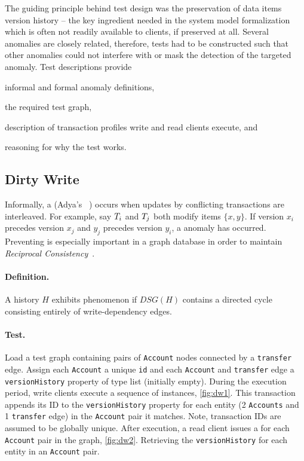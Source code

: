 The guiding principle behind test design was the preservation of data items
version history -- the key ingredient needed in the system model formalization
which is often not readily available to clients, if preserved at all. Several
anomalies are closely related, therefore, tests had to be constructed such that
other anomalies could not interfere with or mask the detection of the targeted
anomaly. Test descriptions provide
\begin{enumerate*}[label={(\roman*)}]
  \item informal and formal anomaly definitions,
  \item the required test graph,
  \item description of transaction profiles write and read clients execute, and
  \item reasoning for why the test works.
\end{enumerate*}


\subsection{Dirty Write}
\label{sec:dirty-write}

Informally, a  (Adya's ~\cite{adya1999weak})
occurs when updates by conflicting transactions are interleaved. For example,
say $T_i$ and $T_j$ both modify items $\{x,y\}$. If version $x_i$
precedes version $x_j$ and $y_j$ precedes version $y_i$, a  anomaly
has occurred. Preventing  is especially important in a graph
database in order to maintain \emph{Reciprocal Consistency}~\cite{Waudby2020}.

\paragraph{Definition.}
A history $H$ exhibits phenomenon  if $\textit{DSG}(H)$ contains a
directed cycle consisting entirely of write-dependency edges.

\paragraph{Test.}
Load a test graph containing pairs of \texttt{Account} nodes connected by a
\texttt{transfer} edge. Assign each \texttt{Account} a unique \texttt{id} and
each \texttt{Account} and \texttt{transfer} edge a \texttt{versionHistory}
property of type list (initially empty). During the execution period, write
clients execute a sequence of  instances, \autoref{fig:dw1}.
This transaction appends its ID to the \texttt{versionHistory} property for each
entity (2 \texttt{Accounts} and 1 \texttt{transfer} edge) in the \texttt{Account}
pair it matches. Note, transaction IDs are assumed to be globally unique. After
execution, a read client issues a  for each
\texttt{Account} pair in the graph, \autoref{fig:dw2}. Retrieving the
\texttt{versionHistory} for each entity in an \texttt{Account} pair.

